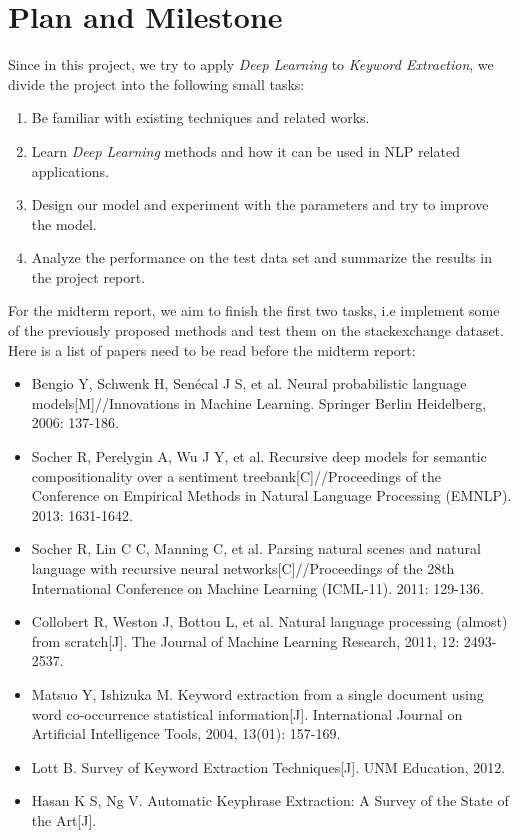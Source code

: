 \documentclass[dvips,12pt]{article}
\begin{document}
	\section{Plan and Milestone}
	Since in this project, we try to apply \emph{Deep Learning} to \emph{Keyword Extraction}, we divide the project into the following small tasks:
	\begin{enumerate}
		\item Be familiar with existing techniques and related works.
		\item Learn \emph{Deep Learning} methods and how it can be used in NLP related applications.
		\item Design our model and  experiment with the parameters and try to improve the model.
		\item Analyze the performance on the test data set and summarize the results in the project report.
	\end{enumerate}
	For the midterm report, we aim to finish the first two tasks, i.e implement some of the previously proposed methods and test them on the stackexchange dataset. \\
    Here is a list of papers need to be read before the midterm report:
    \begin{itemize}
        \item Bengio Y, Schwenk H, Senécal J S, et al. Neural probabilistic language models[M]//Innovations in Machine Learning. Springer Berlin Heidelberg, 2006: 137-186.
        \item Socher R, Perelygin A, Wu J Y, et al. Recursive deep models for semantic compositionality over a sentiment treebank[C]//Proceedings of the Conference on Empirical Methods in Natural Language Processing (EMNLP). 2013: 1631-1642.
        \item Socher R, Lin C C, Manning C, et al. Parsing natural scenes and natural language with recursive neural networks[C]//Proceedings of the 28th International Conference on Machine Learning (ICML-11). 2011: 129-136.
        \item Collobert R, Weston J, Bottou L, et al. Natural language processing (almost) from scratch[J]. The Journal of Machine Learning Research, 2011, 12: 2493-2537.
        \item Matsuo Y, Ishizuka M. Keyword extraction from a single document using word co-occurrence statistical information[J]. International Journal on Artificial Intelligence Tools, 2004, 13(01): 157-169.
        \item Lott B. Survey of Keyword Extraction Techniques[J]. UNM Education, 2012.
        \item Hasan K S, Ng V. Automatic Keyphrase Extraction: A Survey of the State of the Art[J].
    \end{itemize}
\end{document}
